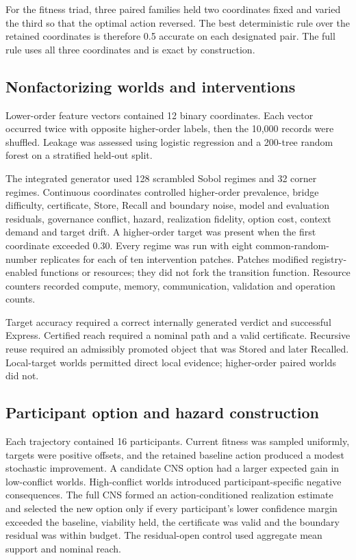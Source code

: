 \documentclass[10pt]{article}
\begin{document}
For the fitness triad, three paired families held two coordinates fixed and varied the third so that the optimal action reversed. The best deterministic rule over the retained coordinates is therefore 0.5 accurate on each designated pair. The full rule uses all three coordinates and is exact by construction.

\subsection*{Nonfactorizing worlds and interventions}
Lower-order feature vectors contained 12 binary coordinates. Each vector occurred twice with opposite higher-order labels, then the 10,000 records were shuffled. Leakage was assessed using logistic regression and a 200-tree random forest on a stratified held-out split.

The integrated generator used 128 scrambled Sobol regimes and 32 corner regimes. Continuous coordinates controlled higher-order prevalence, bridge difficulty, certificate, Store, Recall and boundary noise, model and evaluation residuals, governance conflict, hazard, realization fidelity, option cost, context demand and target drift. A higher-order target was present when the first coordinate exceeded 0.30. Every regime was run with eight common-random-number replicates for each of ten intervention patches. Patches modified registry-enabled functions or resources; they did not fork the transition function. Resource counters recorded compute, memory, communication, validation and operation counts.

Target accuracy required a correct internally generated verdict and successful Express. Certified reach required a nominal path and a valid certificate. Recursive reuse required an admissibly promoted object that was Stored and later Recalled. Local-target worlds permitted direct local evidence; higher-order paired worlds did not.

\subsection*{Participant option and hazard construction}
Each trajectory contained 16 participants. Current fitness was sampled uniformly, targets were positive offsets, and the retained baseline action produced a modest stochastic improvement. A candidate CNS option had a larger expected gain in low-conflict worlds. High-conflict worlds introduced participant-specific negative consequences. The full CNS formed an action-conditioned realization estimate and selected the new option only if every participant's lower confidence margin exceeded the baseline, viability held, the certificate was valid and the boundary residual was within budget. The residual-open control used aggregate mean support and nominal reach.
\end{document}
